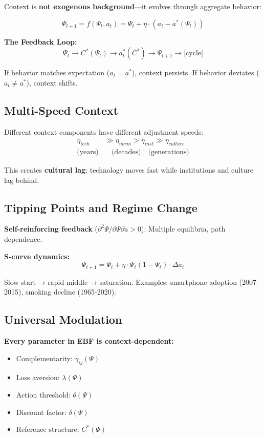 Context is \textbf{not exogenous background}---it evolves through aggregate behavior:

\begin{equation}
\boxed{
\Psi_{t+1} = f(\Psi_t, a_t) = \Psi_t + \eta \cdot (a_t - a^*(\Psi_t))
}
\label{eq:mp-context-dynamics}
\end{equation}

\textbf{The Feedback Loop:}
\[
\Psi_t \to C^*(\Psi_t) \to a_t^*(C^*) \to \Psi_{t+1} \to \text{[cycle]}
\]

If behavior matches expectation ($a_t = a^*$), context persists.
If behavior deviates ($a_t \neq a^*$), context shifts.

\subsection{Multi-Speed Context}

Different context components have different adjustment speeds:
\begin{align}
\eta_{tech} &\gg \eta_{norm} > \eta_{inst} \gg \eta_{culture} \\
\text{(years)} &\quad \text{(decades)} \quad \text{(generations)}
\end{align}

This creates \textbf{cultural lag}: technology moves fast while institutions and culture lag behind.

\subsection{Tipping Points and Regime Change}

\textbf{Self-reinforcing feedback} ($\partial^2\Psi/\partial\Psi \partial a > 0$): Multiple equilibria, path dependence.

\textbf{S-curve dynamics:}
\begin{equation}
\Psi_{t+1} = \Psi_t + \eta \cdot \Psi_t (1 - \Psi_t) \cdot \Delta a_t
\label{eq:mp-s-curve}
\end{equation}

Slow start → rapid middle → saturation. Examples: smartphone adoption (2007-2015), smoking decline (1965-2020).

\subsection{Universal Modulation}

\textbf{Every parameter in EBF is context-dependent:}
\begin{itemize}[nosep]
\item Complementarity: $\gamma_{ij}(\Psi)$
\item Loss aversion: $\lambda(\Psi)$
\item Action threshold: $\theta(\Psi)$
\item Discount factor: $\delta(\Psi)$
\item Reference structure: $C^*(\Psi)$
\end{itemize}

